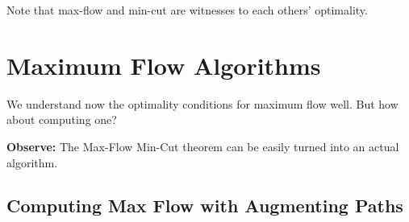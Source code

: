 \documentclass{article}
\begin{document}
Note that max-flow and min-cut are witnesses to each others'
optimality.


\section{Maximum Flow Algorithms}

We understand now the optimality conditions for maximum flow well. But how about computing one?

\textbf{Observe:} The Max-Flow Min-Cut theorem can be easily turned into an actual algorithm. 

\subsection{Computing Max Flow with Augmenting Paths}
\end{document}
